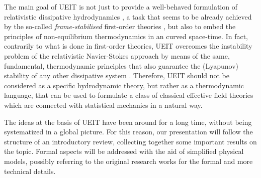 \documentclass[a4paper, amsfonts, amssymb, amsmath, reprint, twocolumn, showkeys, nofootinbib]{revtex4-2}
\begin{document}
The main goal of UEIT is not just to provide a well-behaved formulation of relativistic dissipative hydrodynamics \cite{AnilePavon1998}, a task that seems to be already achieved by the so-called \emph{frame-stabilised} first-order theories \citep{Kovtun2019,BemficaDNDefinitivo2020}, but also to embed the principles of non-equilibrium thermodynamics in an curved space-time. 
In fact, contrarily to what is done in first-order theories, UEIT overcomes the instability problem of the relativistic Navier-Stokes approach by means of the same, fundamental, thermodynamic principles that also guarantee the (Lyapunov) stability of any other dissipative system \citep{GavassinoLyapunov_2020,Prigogine1978,PrigoginebookModernThermodynamics2014}. 
Therefore,  UEIT should not be considered as a specific hydrodynamic theory, but rather as a thermodynamic language, that can be used to formulate a class of classical effective field theories which are connected with statistical mechanics in a natural way.  

The ideas at the basis of UEIT have been around for a long time, without being systematized in a global picture. For this reason, our presentation will follow the structure of an introductory review, collecting together some important results on the topic. Formal aspects will be addressed with the aid of simplified physical models, possibly referring to the original research works for the formal and more technical details. 
\end{document}
